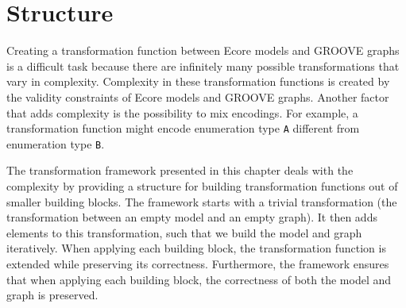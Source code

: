 \section{Structure}
\label{sec:transformation_framework:structure}

Creating a transformation function between Ecore models and GROOVE graphs is a difficult task because there are infinitely many possible transformations that vary in complexity. Complexity in these transformation functions is created by the validity constraints of Ecore models and GROOVE graphs. Another factor that adds complexity is the possibility to mix encodings. For example, a transformation function might encode enumeration type \texttt{A} different from enumeration type \texttt{B}.

The transformation framework presented in this chapter deals with the complexity by providing a structure for building transformation functions out of smaller building blocks. The framework starts with a trivial transformation (the transformation between an empty model and an empty graph). It then adds elements to this transformation, such that we build the model and graph iteratively. When applying each building block, the transformation function is extended while preserving its correctness. Furthermore, the framework ensures that when applying each building block, the correctness of both the model and graph is preserved.

